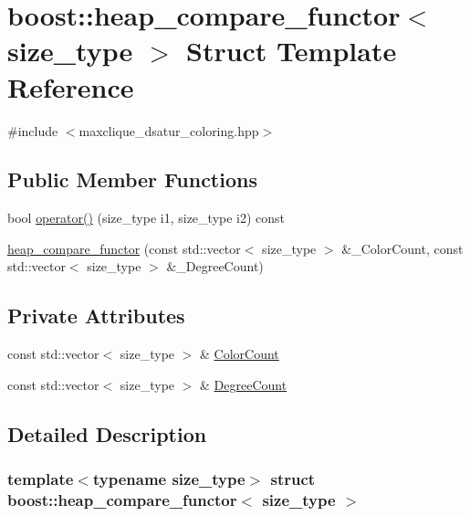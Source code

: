 \hypertarget{structboost_1_1heap__compare__functor}{}\section{boost\+:\+:heap\+\_\+compare\+\_\+functor$<$ size\+\_\+type $>$ Struct Template Reference}
\label{structboost_1_1heap__compare__functor}


{\ttfamily \#include $<$maxclique\+\_\+dsatur\+\_\+coloring.\+hpp$>$}

\subsection*{Public Member Functions}
\begin{DoxyCompactItemize}
\item 
bool \hyperlink{structboost_1_1heap__compare__functor_afbbfb062a71b1f7f10ec0d39ee438e88}{operator()} (size\+\_\+type i1, size\+\_\+type i2) const
\item 
\hyperlink{structboost_1_1heap__compare__functor_a22d21e8d1f0edb76384dfccac7395791}{heap\+\_\+compare\+\_\+functor} (const std\+::vector$<$ size\+\_\+type $>$ \&\+\_\+\+Color\+Count, const std\+::vector$<$ size\+\_\+type $>$ \&\+\_\+\+Degree\+Count)
\end{DoxyCompactItemize}
\subsection*{Private Attributes}
\begin{DoxyCompactItemize}
\item 
const std\+::vector$<$ size\+\_\+type $>$ \& \hyperlink{structboost_1_1heap__compare__functor_a69c068ccbfb302b79492da20236f8783}{Color\+Count}
\item 
const std\+::vector$<$ size\+\_\+type $>$ \& \hyperlink{structboost_1_1heap__compare__functor_aab2d0fa30b3527f610b4edc3652baeef}{Degree\+Count}
\end{DoxyCompactItemize}


\subsection{Detailed Description}
\subsubsection*{template$<$typename size\+\_\+type$>$\newline
struct boost\+::heap\+\_\+compare\+\_\+functor$<$ size\+\_\+type $>$}



